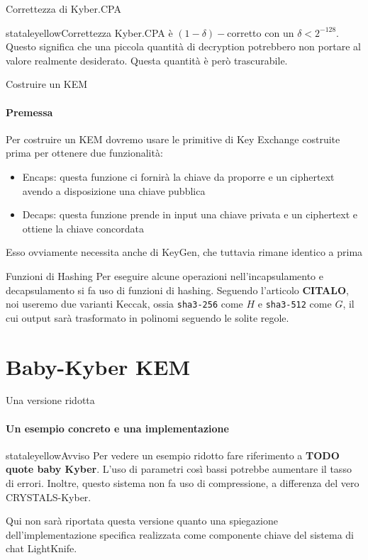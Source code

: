     \begin{frame}{Correttezza di Kyber.CPA}

    \begin{colorblock}{stataleyellow}{Correttezza}
        Kyber.CPA è $(1-\delta)-$corretto con un $\delta<2^{-128}$. Questo significa che una piccola quantità di decryption potrebbero non portare al valore realmente desiderato. Questa quantità è però trascurabile.
    \end{colorblock}

    \end{frame}

\begin{frame}{Costruire un KEM}
    \framesubtitle{Premessa}
    Per costruire un KEM dovremo usare le primitive di Key Exchange costruite prima per ottenere due funzionalità:\begin{itemize}
    \item Encaps: questa funzione ci fornirà la chiave da proporre e un ciphertext avendo a disposizione una chiave pubblica
    \item Decaps: questa funzione prende in input una chiave privata e un ciphertext e ottiene la chiave concordata
    \end{itemize}
    Esso ovviamente necessita anche di KeyGen, che tuttavia rimane identico a prima
\end{frame}

\begin{frame}{Funzioni di Hashing}
    Per eseguire alcune operazioni nell'incapsulamento e decapsulamento si fa uso di funzioni di hashing. Seguendo l'articolo \textbf{CITALO}, noi useremo due varianti Keccak, ossia \texttt{sha3-256} come $H$ e \texttt{sha3-512} come $G$, il cui output sarà trasformato in polinomi seguendo le solite regole.
\end{frame}

\section{Baby-Kyber KEM}

\begin{frame}{Una versione ridotta}
    \framesubtitle{Un esempio concreto e una implementazione}
    \begin{colorblock}{stataleyellow}{Avviso}
        Per vedere un esempio ridotto fare riferimento a \textbf{TODO quote baby Kyber}. L'uso di parametri così bassi potrebbe aumentare il tasso di errori. Inoltre, questo sistema non fa uso di compressione, a differenza del vero CRYSTALS-Kyber.
    \end{colorblock}

    Qui non sarà riportata questa versione quanto una spiegazione dell'implementazione specifica realizzata come componente chiave del sistema di chat LightKnife.

\end{frame}



